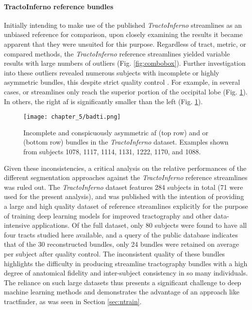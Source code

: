 \paragraph*{TractoInferno reference bundles}


Initially intending to make use of the published \textit{TractoInferno} streamlines as an unbiased reference for comparison, upon closely examining the results it became apparent that they were unsuited for this purpose.
Regardless of tract, metric, or compared methods, the \textit{TractoInferno} reference streamlines yielded variable results with large numbers of outliers (Fig. \ref{fig:combobox}).
Further investigation into these outliers revealed numerous subjects with incomplete or highly asymmetric bundles, this despite strict quality control \autocite{Poulin2022a}.
For example, in several cases, \gls{or} streamlines only reach the superior portion of the occipital lobe (Fig. \ref{fig:duds}).
In others, the right \gls{af} is significantly smaller than the left (Fig. \ref{fig:duds}).

\begin{figure}
  \centering
  \texttt{[image: chapter\_5/badti.png]}
  \caption[Incomplete bundles in the \textit{TractoInferno} reference data]{Incomplete and conspicuously asymmetric \gls{af} (top row) and \gls{or} (bottom row) bundles in the \textit{TractoInferno} dataset. Examples shown from subjects 1078, 1117, 1114, 1131, 1222, 1170, and 1088.}
  \label{fig:duds}
\end{figure}

Given these inconsistencies, a critical analysis on the relative performances of the different segmentation approaches against the \textit{TractoInferno} reference streamlines was ruled out.
The \textit{TractoInferno} dataset features 284 subjects in total (71 were used for the present analysis), and was published with the intention of providing a large and high quality dataset of reference streamlines explicitly for the purpose of training deep learning models for improved tractography and other data-intensive applications.
Of the full dataset, only 80 subjects were found to have all four tracts studied here available, and a query of the public database\autocite{Poulin2022a} indicates that of the 30 reconstructed bundles, only 24 bundles were retained on average per subject after quality control.
The inconsistent quality of these bundles highlights the difficulty in producing streamline tractography bundles with a high degree of anatomical fidelity and inter-subject consistency in so many individuals.
The reliance on such large datasets thus presents a significant challenge to deep machine learning methods and demonstrates the advantage of an approach like tractfinder, as was seen in Section \ref{sec:ntrain}.


